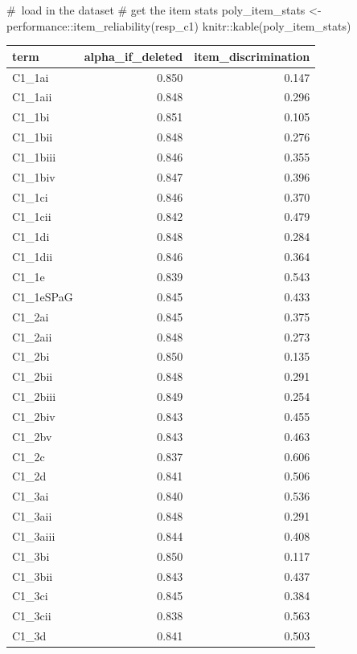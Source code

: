 \documentclass[
  letterpaper,
  DIV=11,
  numbers=noendperiod]{scrreprt}
\newenvironment{Shaded}{\begin{snugshade}}{\end{snugshade}}
\newcommand{\CommentTok}[1]{\textcolor[rgb]{0.37,0.37,0.37}{#1}}
\newcommand{\FunctionTok}[1]{\textcolor[rgb]{0.28,0.35,0.67}{#1}}
\newcommand{\NormalTok}[1]{\textcolor[rgb]{0.00,0.23,0.31}{#1}}
\newcommand{\OtherTok}[1]{\textcolor[rgb]{0.00,0.23,0.31}{#1}}
\newcommand{\SpecialCharTok}[1]{\textcolor[rgb]{0.37,0.37,0.37}{#1}}
\begin{document}
\begin{Shaded}
\begin{Highlighting}[]
\CommentTok{\# load in the dataset}
\CommentTok{\# get the item stats}
\NormalTok{poly\_item\_stats }\OtherTok{\textless{}{-}}\NormalTok{ performance}\SpecialCharTok{::}\FunctionTok{item\_reliability}\NormalTok{(resp\_c1)}
\NormalTok{knitr}\SpecialCharTok{::}\FunctionTok{kable}\NormalTok{(poly\_item\_stats)}
\end{Highlighting}
\end{Shaded}

\begin{longtable}[]{@{}lrr@{}}
\toprule\noalign{}
term & alpha\_if\_deleted & item\_discrimination \\
\midrule\noalign{}
\endhead
\bottomrule\noalign{}
\endlastfoot
C1\_1ai & 0.850 & 0.147 \\
C1\_1aii & 0.848 & 0.296 \\
C1\_1bi & 0.851 & 0.105 \\
C1\_1bii & 0.848 & 0.276 \\
C1\_1biii & 0.846 & 0.355 \\
C1\_1biv & 0.847 & 0.396 \\
C1\_1ci & 0.846 & 0.370 \\
C1\_1cii & 0.842 & 0.479 \\
C1\_1di & 0.848 & 0.284 \\
C1\_1dii & 0.846 & 0.364 \\
C1\_1e & 0.839 & 0.543 \\
C1\_1eSPaG & 0.845 & 0.433 \\
C1\_2ai & 0.845 & 0.375 \\
C1\_2aii & 0.848 & 0.273 \\
C1\_2bi & 0.850 & 0.135 \\
C1\_2bii & 0.848 & 0.291 \\
C1\_2biii & 0.849 & 0.254 \\
C1\_2biv & 0.843 & 0.455 \\
C1\_2bv & 0.843 & 0.463 \\
C1\_2c & 0.837 & 0.606 \\
C1\_2d & 0.841 & 0.506 \\
C1\_3ai & 0.840 & 0.536 \\
C1\_3aii & 0.848 & 0.291 \\
C1\_3aiii & 0.844 & 0.408 \\
C1\_3bi & 0.850 & 0.117 \\
C1\_3bii & 0.843 & 0.437 \\
C1\_3ci & 0.845 & 0.384 \\
C1\_3cii & 0.838 & 0.563 \\
C1\_3d & 0.841 & 0.503 \\
\end{longtable}
\end{document}
